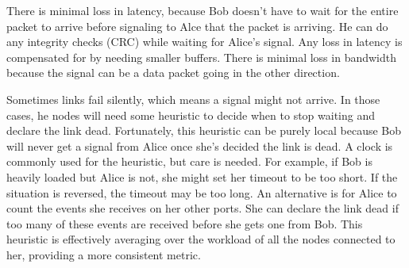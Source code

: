 \documentclass[../../../OAE-SPEC-MAIN.tex]{subfiles}
\begin{document}
There is minimal loss in latency, because Bob doesn't have to wait for the entire packet to arrive before signaling to Alce that the packet is arriving.  He can do any integrity checks (CRC) while waiting for Alice's signal.  Any loss in latency is compensated for by needing smaller buffers.  There is minimal loss in bandwidth because the signal can be a data packet going in the other direction.

Sometimes links fail silently, which means a signal might not arrive.  In those cases, he nodes will need some heuristic to decide when to stop waiting and declare the link dead.  Fortunately, this heuristic can be purely local because Bob will never get a signal from Alice once she's decided the link is dead.  A clock is commonly used for the heuristic, but care is needed.  For example, if Bob is heavily loaded but Alice is not, she might set her timeout to be too short.  If the situation is reversed, the timeout may be too long.  An alternative is for Alice to count the events she receives on her other ports.  She can declare the link dead if too many of these events are received before she gets one from Bob.  This heuristic is effectively averaging over the workload of all the nodes connected to her, providing a more consistent metric.
\end{document}
